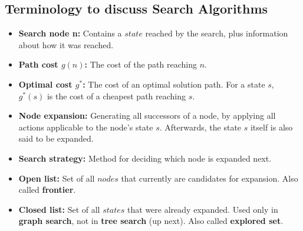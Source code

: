 \documentclass[conference]{styles/acmsiggraph}
\begin{document}
        
        
        
        
        

    \subsection{Terminology to discuss Search Algorithms}
        \begin{itemize}
            \item \textbf{Search node n:}\newline
                Contains a $state$ reached by the search, plus information about how it was reached.
            \item \textbf{Path cost $g(n)$:}\newline
                The cost of the path reaching $n$.
            \item \textbf{Optimal cost $g^*$:}\newline
                The cost of an optimal solution path.
                For a state $s$, $g^*(s)$ is the cost of a cheapest path reaching $s$.
            \item \textbf{Node expansion:}\newline
                Generating all successors of a node, by applying all actions applicable to the node's state $s$.
                Afterwards, the state $s$ itself is also said to be expanded.
            \item \textbf{Search strategy:}\newline
                Method for deciding which node is expanded next.
            \item \textbf{Open list:}\newline
                Set of all $nodes$ that currently are candidates for expansion.
                Also called \textbf{frontier}.
            \item \textbf{Closed list:}\newline
                Set of all $states$ that were already expanded.
                Used only in \textbf{graph search}, not in \textbf{tree search} (up next).
                Also called \textbf{explored set}.
        \end{itemize}
    
\end{document}
